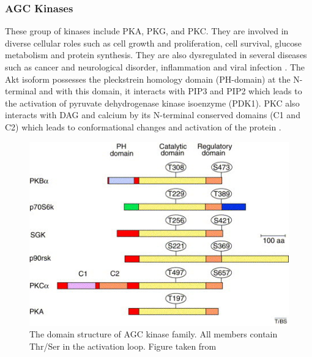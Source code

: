 \documentclass[a4paper, 11pt]{article}
\begin{document}
\subsubsection*{AGC Kinases}
These group of kinases include PKA, PKG, and PKC. They are involved in diverse cellular roles such as cell growth and proliferation, cell survival, glucose metabolism and protein synthesis. They are also dysregulated in several diseases such as cancer and neurological disorder, inflammation and viral infection \cite {rakshambikai2015typical}. The Akt isoform possesses the pleckstrein homology domain (PH-domain) at the N-terminal and with this domain, it interacts with PIP3 and PIP2  which leads to the activation of pyruvate dehydrogenase kinase isoenzyme (PDK1). PKC also interacts with DAG and calcium by its N-terminal conserved domains (C1 and C2) which leads to conformational changes and activation of the protein \cite{duong2013human}.\\
\begin{figure}[H]
	\includegraphics[width=.7\linewidth]{figures/agc_kinase.jpg}
	\centering
	\caption{The domain structure of AGC kinase family. All members contain Thr/Ser in the activation loop. Figure taken from \cite{brazil2001ten} }
	\label{agc_kinase}
\end{figure}
\end{document}
